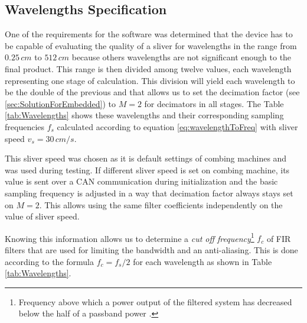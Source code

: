 \documentclass[twoside]{ctuthesis}
\theoremstyle{plain}
\theoremstyle{definition}
\theoremstyle{note}
\begin{document}
\subsection{Wavelengths Specification}
\label{sec:WavelengthSpecification}
One of the requirements for the software was determined that the device has to be capable of evaluating the quality of a sliver for wavelengths in the range from $0.25\,cm$ to $512\,cm$ because others wavelengths are not significant enough to the final product. This range is then divided among twelve values, each wavelength representing one stage of calculation. This division will yield each wavelength to be the double of the previous and that allows us to set the decimation factor (see \ref{sec:SolutionForEmbedded}) to $M=2$ for decimators in all stages. The Table \ref{tab:Wavelengths} shows these wavelengths and their corresponding sampling frequencies $f_s$ calculated according to equation \ref{eq:wavelengthToFreq} with sliver speed $v_{s}=30\,cm/s$. 

This sliver speed was chosen as it is default settings of combing machines and was used during testing. If different sliver speed is set on combing machine, its value is sent over a CAN communication during initialization and the basic sampling frequency is adjusted in a way that decimation factor always stays set on $M=2$. This allows using the same filter coefficients independently on the value of sliver speed.

Knowing this information allows us to determine a \textit{cut off frequency}\footnote{Frequency above which a power output of the filtered system has decreased below the half of a passband power \cite{cite:RT_DSP}.} $f_c$ of FIR filters that are used for limiting the bandwidth and an anti-aliasing. This is done according to the formula $f_c=f_s/2$ for each wavelength as shown in Table \ref{tab:Wavelengths}.
\end{document}
